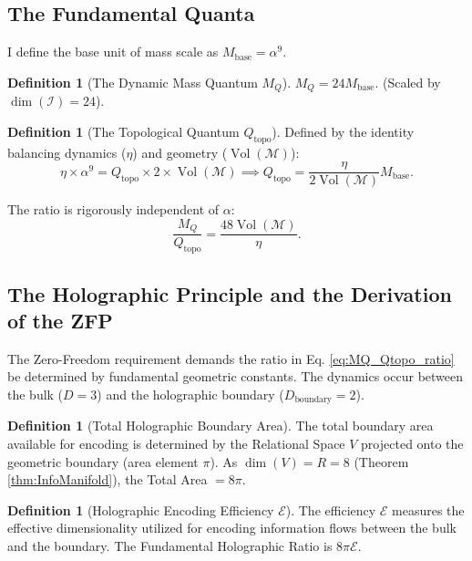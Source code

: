 \documentclass[11pt, a4paper]{article}
\theoremstyle{definition}
\newtheorem{definition}[theorem]{Definition}
\theoremstyle{definition}
\newcommand{\M}{\mathcal{M}}
\newcommand{\Qtopo}{Q_{\text{topo}}}
\newcommand{\MQ}{M_{Q}}
\newcommand{\Ical}{\mathcal{I}}
\newcommand{\Vol}{\operatorname{Vol}}
\newcommand{\Mbase}{M_{\text{base}}}
\newcommand{\Veight}{\Vol(\M)}
\newcommand{\Ecal}{\mathcal{E}} %
\newcommand{\Dboundary}{D_{\mathrm{boundary}}}
\begin{document}
\subsection{The Fundamental Quanta}

I define the base unit of mass scale as $\Mbase = \alpha^9$.

\begin{definition}[The Dynamic Mass Quantum $\MQ$]
$\MQ = 24 \Mbase$. (Scaled by $\dim(\Ical)=24$).
\end{definition}

\begin{definition}[The Topological Quantum $\Qtopo$]
Defined by the identity balancing dynamics ($\eta$) and geometry ($\Veight$):
\begin{equation}
    \eta \times \alpha^9 = \Qtopo \times 2 \times \Veight \implies \Qtopo = \frac{\eta}{2 \Veight} \Mbase.
\end{equation}
\end{definition}

The ratio is rigorously independent of $\alpha$:
\begin{equation}
    \frac{\MQ}{\Qtopo} = \frac{48 \Veight}{\eta}. \label{eq:MQ_Qtopo_ratio}
\end{equation}

\subsection{The Holographic Principle and the Derivation of the ZFP}

The Zero-Freedom requirement demands the ratio in Eq. \eqref{eq:MQ_Qtopo_ratio} be determined by fundamental geometric constants. The dynamics occur between the bulk ($D=3$) and the holographic boundary ($\Dboundary=2$).

\begin{definition}[Total Holographic Boundary Area]
The total boundary area available for encoding is determined by the Relational Space $V$ projected onto the geometric boundary (area element $\pi$). As $\dim(V)=R=8$ (Theorem \ref{thm:InfoManifold}), the Total Area $= 8\pi$.
\end{definition}

\begin{definition}[Holographic Encoding Efficiency $\Ecal$]
The efficiency $\Ecal$ measures the effective dimensionality utilized for encoding information flows between the bulk and the boundary. The Fundamental Holographic Ratio is $8\pi \Ecal$.
\end{definition}
\end{document}
